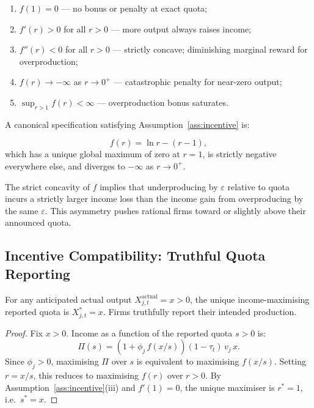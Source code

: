 \begin{assumption}\label{ass:incentive}
\hfill
\begin{enumerate}
    \item $f(1) = 0$ \quad --- no bonus or penalty at exact quota;
    \item $f'(r) > 0$ for all $r > 0$ \quad --- more output always raises income;
    \item $f''(r) < 0$ for all $r > 0$ \quad --- strictly concave; diminishing
          marginal reward for overproduction;
    \item $f(r) \to -\infty$ as $r \to 0^+$ \quad --- catastrophic penalty for
          near-zero output;
    \item $\sup_{r>1} f(r) < \infty$ \quad --- overproduction bonus saturates.
\end{enumerate}
\end{assumption}

A canonical specification satisfying Assumption~\ref{ass:incentive} is:

\begin{equation}\label{eq:incentive-log}
    f(r) = \ln r - (r - 1),
\end{equation}
which has a unique global maximum of zero at $r = 1$, is strictly negative everywhere
else, and diverges to $-\infty$ as $r \to 0^+$.

\begin{remark}\label{rem:asymmetric}
The strict concavity of $f$ implies that underproducing by $\varepsilon$ relative to
quota incurs a strictly larger income loss than the income gain from overproducing by
the same $\varepsilon$. This asymmetry pushes rational firms toward or slightly above
their announced quota.
\end{remark}

\subsection{Incentive Compatibility: Truthful Quota Reporting}\label{sec:incentive-compatibility}

\begin{theorem}\label{thm:truthful}
For any anticipated actual output $X_{j,t}^{\text{actual}} = x > 0$, the unique
income-maximising reported quota is $X_{j,t}^* = x$. Firms truthfully report their
intended production.
\end{theorem}

\begin{proof}
Fix $x > 0$. Income as a function of the reported quota $s > 0$ is:
\begin{equation*}
    \Pi(s) = (1  + \phi_j\, f(x/s) ) (1-\tau_t)\,v_j\,x .
\end{equation*}
Since $\phi_j > 0$, maximising $\Pi$ over $s$ is equivalent to maximising $f(x/s)$.
Setting $r = x/s$, this reduces to maximising $f(r)$ over $r > 0$. By
Assumption~\ref{ass:incentive}(iii) and $f'(1) = 0$, the unique maximiser is $r^* = 1$,
i.e.\ $s^* = x$.
\end{proof}

